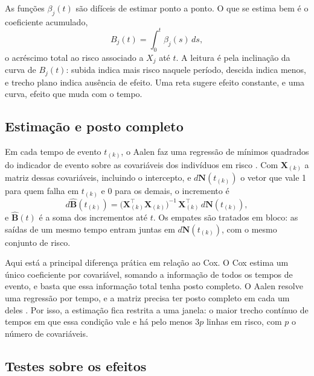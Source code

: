 As funções $\beta_j(t)$ são difíceis de estimar ponto a ponto. O que se estima bem é o coeficiente acumulado,
\begin{equation}
    B_j(t) = \int_0^{t} \beta_j(s)\,ds,
    \label{eq:cum_coef}
\end{equation}
o acréscimo total ao risco associado a $X_j$ até $t$. A leitura é pela inclinação da curva de $B_j(t)$: subida indica mais risco naquele período, descida indica menos, e trecho plano indica ausência de efeito. Uma reta sugere efeito constante, e uma curva, efeito que muda com o tempo.

    \subsection{Estimação e posto completo}
    \label{subsec:aalen_coef}

Em cada tempo de evento $t_{(k)}$, o Aalen faz uma regressão de mínimos quadrados do indicador de evento sobre as covariáveis dos indivíduos em risco \citep{aalen1980}. Com $\mathbf{X}_{(k)}$ a matriz dessas covariáveis, incluindo o intercepto, e $d\mathbf{N}(t_{(k)})$ o vetor que vale 1 para quem falha em $t_{(k)}$ e 0 para os demais, o incremento é
\begin{equation}
    d\hat{\mathbf{B}}(t_{(k)}) = \bigl(\mathbf{X}_{(k)}^{\top}\mathbf{X}_{(k)}\bigr)^{-1}\,\mathbf{X}_{(k)}^{\top}\,d\mathbf{N}(t_{(k)}),
    \label{eq:aalen_est}
\end{equation}
e $\hat{\mathbf{B}}(t)$ é a soma dos incrementos até $t$. Os empates são tratados em bloco: as saídas de um mesmo tempo entram juntas em $d\mathbf{N}(t_{(k)})$, com o mesmo conjunto de risco.

Aqui está a principal diferença prática em relação ao Cox. O Cox estima um único coeficiente por covariável, somando a informação de todos os tempos de evento, e basta que essa informação total tenha posto completo. O Aalen resolve uma regressão por tempo, e a matriz precisa ter posto completo em cada um deles \citep{aalen1980,martinussen2006}. Por isso, a estimação fica restrita a uma janela: o maior trecho contínuo de tempos em que essa condição vale e há pelo menos $3p$ linhas em risco, com $p$ o número de covariáveis.
\label{subsec:cox_aalen_comparacao}

    \subsection{Testes sobre os efeitos}
    \label{subsec:aalen_testes}


